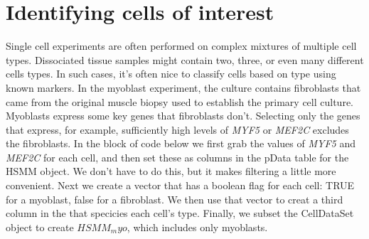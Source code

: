 \documentclass[10pt,oneside]{article}\usepackage[]{graphicx}\usepackage[]{color}
\begin{document}
\section{Identifying cells of interest}

Single cell experiments are often performed on complex mixtures of multiple cell types. Dissociated tissue samples might contain two, three, or even many different cells types. In such cases, it's often nice to classify cells based on type using known markers. In the myoblast experiment, the culture contains fibroblasts that came from the original muscle biopsy used to establish the primary cell culture.  Myoblasts express some key genes that fibroblasts don't. Selecting only the genes that express, for example, sufficiently high levels of \emph{MYF5} or \emph{MEF2C} excludes the fibroblasts. In the block of code below we first grab the values of \emph{MYF5} and \emph{MEF2C} for each cell, and then set these as columns in the pData table for the HSMM object.  We don't have to do this, but it makes filtering a little more convenient. Next we create a vector that has a boolean flag for each cell: TRUE for a myoblast, false for a fibroblast. We then use that vector to creat a third column in the that specicies each cell's type. Finally, we subset the CellDataSet object to create $HSMM_myo$, which includes only myoblasts.  
\end{document}
